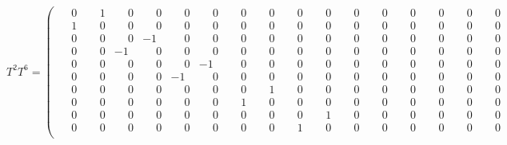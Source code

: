 \documentclass[10pt]{article}
\begin{document}
\[
T^{2}T^{6} = \left(\begin{smallmatrix}
\phantom{-}0 & \phantom{-}1 & \phantom{-}0 & \phantom{-}0 & \phantom{-}0 & \phantom{-}0 & \phantom{-}0 & \phantom{-}0 & \phantom{-}0 & \phantom{-}0 & \phantom{-}0 & \phantom{-}0 & \phantom{-}0 & \phantom{-}0 & \phantom{-}0 & \phantom{-}0 \\
\phantom{-}1 & \phantom{-}0 & \phantom{-}0 & \phantom{-}0 & \phantom{-}0 & \phantom{-}0 & \phantom{-}0 & \phantom{-}0 & \phantom{-}0 & \phantom{-}0 & \phantom{-}0 & \phantom{-}0 & \phantom{-}0 & \phantom{-}0 & \phantom{-}0 & \phantom{-}0 \\
\phantom{-}0 & \phantom{-}0 & \phantom{-}0 & -1 & \phantom{-}0 & \phantom{-}0 & \phantom{-}0 & \phantom{-}0 & \phantom{-}0 & \phantom{-}0 & \phantom{-}0 & \phantom{-}0 & \phantom{-}0 & \phantom{-}0 & \phantom{-}0 & \phantom{-}0 \\
\phantom{-}0 & \phantom{-}0 & -1 & \phantom{-}0 & \phantom{-}0 & \phantom{-}0 & \phantom{-}0 & \phantom{-}0 & \phantom{-}0 & \phantom{-}0 & \phantom{-}0 & \phantom{-}0 & \phantom{-}0 & \phantom{-}0 & \phantom{-}0 & \phantom{-}0 \\
\phantom{-}0 & \phantom{-}0 & \phantom{-}0 & \phantom{-}0 & \phantom{-}0 & -1 & \phantom{-}0 & \phantom{-}0 & \phantom{-}0 & \phantom{-}0 & \phantom{-}0 & \phantom{-}0 & \phantom{-}0 & \phantom{-}0 & \phantom{-}0 & \phantom{-}0 \\
\phantom{-}0 & \phantom{-}0 & \phantom{-}0 & \phantom{-}0 & -1 & \phantom{-}0 & \phantom{-}0 & \phantom{-}0 & \phantom{-}0 & \phantom{-}0 & \phantom{-}0 & \phantom{-}0 & \phantom{-}0 & \phantom{-}0 & \phantom{-}0 & \phantom{-}0 \\
\phantom{-}0 & \phantom{-}0 & \phantom{-}0 & \phantom{-}0 & \phantom{-}0 & \phantom{-}0 & \phantom{-}0 & \phantom{-}1 & \phantom{-}0 & \phantom{-}0 & \phantom{-}0 & \phantom{-}0 & \phantom{-}0 & \phantom{-}0 & \phantom{-}0 & \phantom{-}0 \\
\phantom{-}0 & \phantom{-}0 & \phantom{-}0 & \phantom{-}0 & \phantom{-}0 & \phantom{-}0 & \phantom{-}1 & \phantom{-}0 & \phantom{-}0 & \phantom{-}0 & \phantom{-}0 & \phantom{-}0 & \phantom{-}0 & \phantom{-}0 & \phantom{-}0 & \phantom{-}0 \\
\phantom{-}0 & \phantom{-}0 & \phantom{-}0 & \phantom{-}0 & \phantom{-}0 & \phantom{-}0 & \phantom{-}0 & \phantom{-}0 & \phantom{-}0 & \phantom{-}1 & \phantom{-}0 & \phantom{-}0 & \phantom{-}0 & \phantom{-}0 & \phantom{-}0 & \phantom{-}0 \\
\phantom{-}0 & \phantom{-}0 & \phantom{-}0 & \phantom{-}0 & \phantom{-}0 & \phantom{-}0 & \phantom{-}0 & \phantom{-}0 & \phantom{-}1 & \phantom{-}0 & \phantom{-}0 & \phantom{-}0 & \phantom{-}0 & \phantom{-}0 & \phantom{-}0 & \phantom{-}0 \\

\end{smallmatrix}\]
\end{document}
